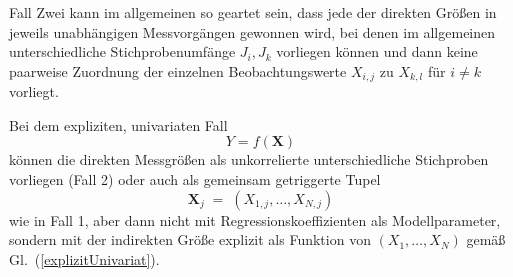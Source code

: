 Fall Zwei kann im allgemeinen so geartet sein, dass jede der direkten Größen in jeweils unabhängigen
Messvorgängen gewonnen wird, bei denen im allgemeinen unterschiedliche Stichprobenumfänge $J_i, J_k$ vorliegen
können und dann keine paarweise Zuordnung der einzelnen Beobachtungswerte $X_{i,j}$ zu $X_{k,l}$ für
$i \neq k$ vorliegt.

Bei dem expliziten, univariaten Fall
\begin{equation}
Y = f(\mathbf{X})
\label{explizitUnivariat}
\end{equation}
können die direkten Messgrößen als unkorrelierte unterschiedliche Stichproben vorliegen (Fall 2)
oder auch als gemeinsam getriggerte Tupel
\begin{equation}
\boldsymbol X_j \; = \; (X_{1,j}, \dots, X_{N,j})
\end{equation}
wie in Fall 1, aber dann nicht mit Regressionskoeffizienten als Modellparameter, sondern
mit der indirekten Größe explizit als Funktion von $(X_{1}, \dots, X_{N})$ gemäß
Gl.~(\ref{explizitUnivariat}).


